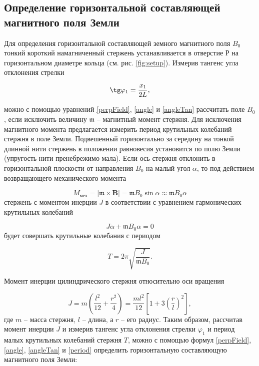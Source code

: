 \documentclass[a4paper,12pt]{article} %
\begin{document}
\subsection{Определение горизонтальной составляющей магнитного поля Земли}

Для определения горизонтальной составляющей земного магнитного
поля $B_0$ тонкий короткий намагниченный стержень устанавливается в
отверстие Р на горизонтальном диаметре кольца (см. рис. \ref{fig:setup}). Измерив тангенс угла отклонения стрелки

\begin{equation}
    \tg\varphi_1 = \frac{x_1}{2L},
\label{angleTan}
\end{equation}

можно с помощью уравнений \eqref{perpField}, \eqref{angle} и \eqref{angleTan} рассчитать поле $B_0$, если исключить величину $\mathfrak{m}$ -- магнитный момент стержня. Для исключения магнитного момента предлагается измерить период крутильных колебаний стержня в поле Земли. Подвешенный горизонтально за середину на тонкой длинной нити стержень в положении равновесия установится по полю Земли (упругость нити пренебрежимо мала). Если ось стержня отклонить в горизонтальной плоскости от
направления $B_0$ на малый угол $\alpha$, то под действием возвращающего механического момента

\begin{equation}
    M_\text{мех} = |\mathbf{\mathfrak{m} \times B}| = \mathfrak{m} B_0 \sin{\alpha} \approx \mathfrak{m} B_0 \alpha
\label{mechMoment}
\end{equation}
стержень с моментом инерции $J$ в соответствии с уравнением гармонических крутильных колебаний

\begin{equation}
    J\ddot{\alpha} + \mathfrak{m} B_0 \alpha = 0
\label{spinOscillation}
\end{equation}
будет совершать крутильные колебания с периодом

\begin{equation}
    T = 2\pi\sqrt{\frac{J}{\mathfrak{m}B_0}}.
\label{period}
\end{equation}

Момент инерции цилиндрического стержня относительно оси вращения

\begin{equation}
    J = m\left(\frac{l^2}{12} + \frac{r^2}{4}\right) = \frac{ml^2}{12}\left[1 + 3\left(\frac{r}{l}\right)^2\right],
\label{inertiaMoment}
\end{equation}
где $m$ -- масса стержня, $l$ -- длина, а $r$ -- его радиус. Таким образом, рассчитав момент инерции $J$ и измерив тангенс угла отклонения стрелки $\varphi_1$ и период малых крутильных колебаний стержня $T$, можно с помощью формул \eqref{perpField}, \eqref{angle}, \eqref{angleTan} и \eqref{period} определить горизонтальную составляющую магнитного поля Земли:
\end{document}
